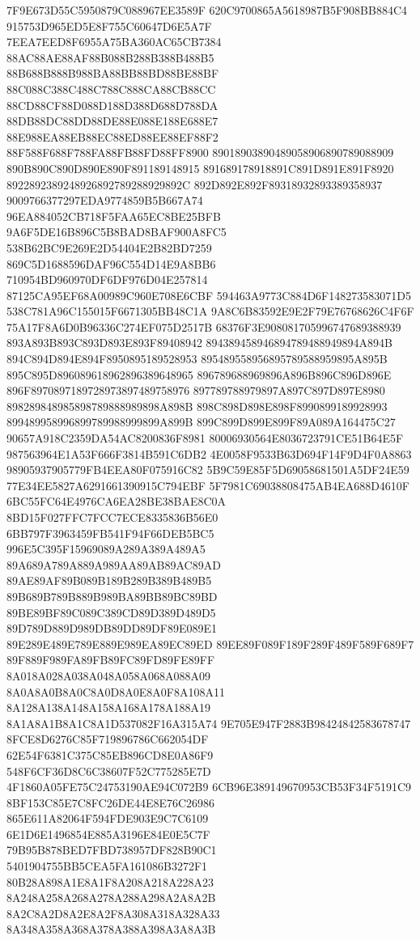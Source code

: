 7F9E673D55C5950879C088967EE3589F
620C9700865A5618987B5F908BB884C4
915753D965ED5E8F755C60647D6E5A7F
7EEA7EED8F6955A75BA360AC65CB7384
88AC88AE88AF88B088B288B388B488B5
88B688B888B988BA88BB88BD88BE88BF
88C088C388C488C788C888CA88CB88CC
88CD88CF88D088D188D388D688D788DA
88DB88DC88DD88DE88E088E188E688E7
88E988EA88EB88EC88ED88EE88EF88F2
88F588F688F788FA88FB88FD88FF8900
89018903890489058906890789088909
890B890C890D890E890F891189148915
891689178918891C891D891E891F8920
8922892389248926892789288929892C
892D892E892F89318932893389358937
9009766377297EDA9774859B5B667A74
96EA884052CB718F5FAA65EC8BE25BFB
9A6F5DE16B896C5B8BAD8BAF900A8FC5
538B62BC9E269E2D54404E2B82BD7259
869C5D1688596DAF96C554D14E9A8BB6
710954BD960970DF6DF976D04E257814
87125CA95EF68A00989C960E708E6CBF
594463A9773C884D6F148273583071D5
538C781A96C155015F6671305BB48C1A
9A8C6B83592E9E2F79E76768626C4F6F
75A17F8A6D0B96336C274EF075D2517B
68376F3E908081705996747689388939
893A893B893C893D893E893F89408942
894389458946894789488949894A894B
894C894D894E894F8950895189528953
895489558956895789588959895A895B
895C895D896089618962896389648965
896789688969896A896B896C896D896E
896F8970897189728973897489758976
897789788979897A897C897D897E8980
898289848985898789888989898A898B
898C898D898E898F8990899189928993
899489958996899789988999899A899B
899C899D899E899F89A089A164475C27
90657A918C2359DA54AC8200836F8981
80006930564E8036723791CE51B64E5F
987563964E1A53F666F3814B591C6DB2
4E0058F9533B63D694F14F9D4F0A8863
98905937905779FB4EEA80F075916C82
5B9C59E85F5D69058681501A5DF24E59
77E34EE5827A6291661390915C794EBF
5F7981C69038808475AB4EA688D4610F
6BC55FC64E4976CA6EA28BE38BAE8C0A
8BD15F027FFC7FCC7ECE8335836B56E0
6BB797F3963459FB541F94F66DEB5BC5
996E5C395F15969089A289A389A489A5
89A689A789A889A989AA89AB89AC89AD
89AE89AF89B089B189B289B389B489B5
89B689B789B889B989BA89BB89BC89BD
89BE89BF89C089C389CD89D389D489D5
89D789D889D989DB89DD89DF89E089E1
89E289E489E789E889E989EA89EC89ED
89EE89F089F189F289F489F589F689F7
89F889F989FA89FB89FC89FD89FE89FF
8A018A028A038A048A058A068A088A09
8A0A8A0B8A0C8A0D8A0E8A0F8A108A11
8A128A138A148A158A168A178A188A19
8A1A8A1B8A1C8A1D537082F16A315A74
9E705E947F2883B98424842583678747
8FCE8D6276C85F719896786C662054DF
62E54F6381C375C85EB896CD8E0A86F9
548F6CF36D8C6C38607F52C775285E7D
4F1860A05FE75C24753190AE94C072B9
6CB96E389149670953CB53F34F5191C9
8BF153C85E7C8FC26DE44E8E76C26986
865E611A82064F594FDE903E9C7C6109
6E1D6E1496854E885A3196E84E0E5C7F
79B95B878BED7FBD738957DF828B90C1
5401904755BB5CEA5FA161086B3272F1
80B28A898A1E8A1F8A208A218A228A23
8A248A258A268A278A288A298A2A8A2B
8A2C8A2D8A2E8A2F8A308A318A328A33
8A348A358A368A378A388A398A3A8A3B
